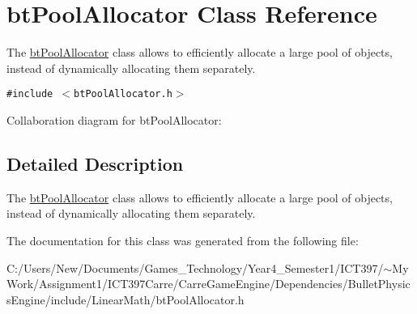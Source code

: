 \hypertarget{classbt_pool_allocator}{
\section{btPoolAllocator Class Reference}
\label{classbt_pool_allocator}
}
The \hyperlink{classbt_pool_allocator}{btPoolAllocator} class allows to efficiently allocate a large pool of objects, instead of dynamically allocating them separately.  


{\tt \#include $<$btPoolAllocator.h$>$}

Collaboration diagram for btPoolAllocator:

\subsection{Detailed Description}
The \hyperlink{classbt_pool_allocator}{btPoolAllocator} class allows to efficiently allocate a large pool of objects, instead of dynamically allocating them separately. 

The documentation for this class was generated from the following file:\begin{CompactItemize}
\item 
C:/Users/New/Documents/Games\_\-Technology/Year4\_\-Semester1/ICT397/$\sim$My Work/Assignment1/ICT397Carre/CarreGameEngine/Dependencies/BulletPhysicsEngine/include/LinearMath/btPoolAllocator.h\end{CompactItemize}
